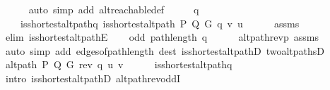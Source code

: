 \begin{isabellebody}
\ \ \ \ \isamarkupfalse%
\ {\isacharparenleft}{\kern0pt}auto\ simp\ add{\isacharcolon}{\kern0pt}\ alt{\isacharunderscore}{\kern0pt}reachable{\isacharunderscore}{\kern0pt}def{\isacharparenright}{\kern0pt}\isanewline
\ \ \isamarkupfalse%
\ \isamarkupfalse%
\ q\ \isanewline
\ \ \ \ is{\isacharunderscore}{\kern0pt}shortest{\isacharunderscore}{\kern0pt}alt{\isacharunderscore}{\kern0pt}path{\isacharunderscore}{\kern0pt}q{\isacharcolon}{\kern0pt}\ {\isachardoublequoteopen}is{\isacharunderscore}{\kern0pt}shortest{\isacharunderscore}{\kern0pt}alt{\isacharunderscore}{\kern0pt}path\ P\ Q\ G\ q\ v\ u{\isachardoublequoteclose}\isanewline
\ \ \ \ \isamarkupfalse%
\ assms{\isacharparenleft}{\kern0pt}{}{\isacharparenright}{\kern0pt}\isanewline
\ \ \ \ \isamarkupfalse%
\ {\isacharparenleft}{\kern0pt}elim\ is{\isacharunderscore}{\kern0pt}shortest{\isacharunderscore}{\kern0pt}alt{\isacharunderscore}{\kern0pt}pathE{\isacharparenright}{\kern0pt}\isanewline
\ \ \isamarkupfalse%
\ {\isachardoublequoteopen}odd\ {\isacharparenleft}{\kern0pt}path{\isacharunderscore}{\kern0pt}length\ q{\isacharparenright}{\kern0pt}{\isachardoublequoteclose}\isanewline
\ \ \ \ \isamarkupfalse%
\ alt{\isacharunderscore}{\kern0pt}path{\isacharunderscore}{\kern0pt}rev{\isacharunderscore}{\kern0pt}p\ assms{\isacharparenleft}{\kern0pt}{}{\isacharcomma}{\kern0pt}\ {}{\isacharparenright}{\kern0pt}\isanewline
\ \ \ \ \isamarkupfalse%
\ {\isacharparenleft}{\kern0pt}auto\ simp\ add{\isacharcolon}{\kern0pt}\ edges{\isacharunderscore}{\kern0pt}of{\isacharunderscore}{\kern0pt}path{\isacharunderscore}{\kern0pt}length\ dest{\isacharcolon}{\kern0pt}\ is{\isacharunderscore}{\kern0pt}shortest{\isacharunderscore}{\kern0pt}alt{\isacharunderscore}{\kern0pt}pathD{\isacharparenleft}{\kern0pt}{}{\isacharparenright}{\kern0pt}\ two{\isacharunderscore}{\kern0pt}alt{\isacharunderscore}{\kern0pt}pathsD{\isacharparenright}{\kern0pt}\isanewline
\ \ \isamarkupfalse%
\ {\isachardoublequoteopen}alt{\isacharunderscore}{\kern0pt}path\ P\ Q\ G\ {\isacharparenleft}{\kern0pt}rev\ q{\isacharparenright}{\kern0pt}\ u\ v{\isachardoublequoteclose}\isanewline
\ \ \ \ \isamarkupfalse%
\ is{\isacharunderscore}{\kern0pt}shortest{\isacharunderscore}{\kern0pt}alt{\isacharunderscore}{\kern0pt}path{\isacharunderscore}{\kern0pt}q\isanewline
\ \ \ \ \isamarkupfalse%
\ {\isacharparenleft}{\kern0pt}intro\ is{\isacharunderscore}{\kern0pt}shortest{\isacharunderscore}{\kern0pt}alt{\isacharunderscore}{\kern0pt}pathD{\isacharparenleft}{\kern0pt}{}{\isacharparenright}{\kern0pt}\ alt{\isacharunderscore}{\kern0pt}path{\isacharunderscore}{\kern0pt}rev{\isacharunderscore}{\kern0pt}oddI{\isacharparenright}{\kern0pt}\isanewline

\end{isabellebody}
